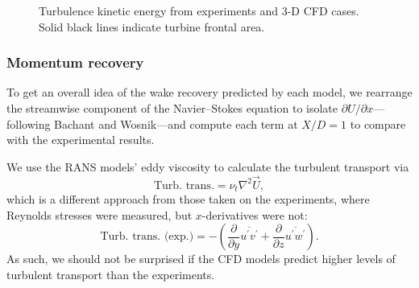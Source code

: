 \begin{figure}
    \centering
%
%
%
%
%
%
%
%
%
%
%

    \caption{Turbulence kinetic energy from experiments and 3-D CFD cases. Solid
        black lines indicate turbine frontal area.}

    \label{fig:kcont}
\end{figure}

\subsubsection{Momentum recovery}

To get an overall idea of the wake recovery predicted by each model, we
rearrange the streamwise component of the Navier--Stokes equation to isolate
$\partial U / \partial x$---following Bachant and
Wosnik\cite{Bachant2015-JoT}---and compute each term at $X/D = 1$ to compare
with the experimental results.

We use the RANS models' eddy viscosity to calculate the turbulent transport via
\begin{equation}
\text{Turb. trans.} = \nu_t \nabla^2 \vec{U},
\label{eq:turb-trans}
\end{equation}
which is a different approach from those taken on the experiments, where Reynolds stresses were measured, but $x$-derivatives were not:
\begin{equation}
\text{Turb. trans. (exp.)} =
-\left(
\frac{\partial}{\partial y} \overline{u^\prime v^\prime}
+
\frac{\partial}{\partial z} \overline{u^\prime w^\prime}
\right).
\end{equation}
As such, we should not be surprised if the CFD models predict higher levels of
turbulent transport than the experiments.

